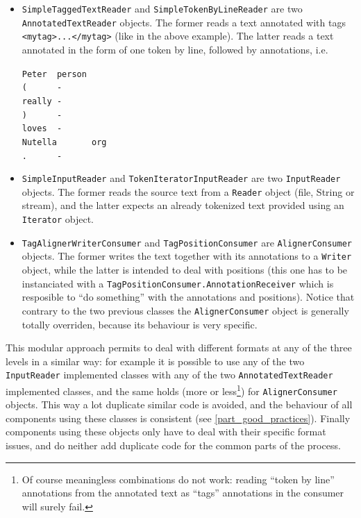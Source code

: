 \documentclass{article}
\newenvironment{xitemize}{
\begin{itemize}
  \setlength{\itemsep}{.3\baselineskip}
  \setlength{\topsep}{0pt}
  \setlength{\parskip}{0pt}
  \setlength{\parsep}{0pt}
}{\end{itemize}}
\begin{document}
\begin{xitemize}
\item {\tt SimpleTaggedTextReader} and {\tt SimpleTokenByLineReader} are two {\tt AnnotatedTextReader} objects. The former reads a text annotated with tags \verb+<mytag>...</mytag>+ (like in the above example). The latter reads a text annotated in the form of one token by line, followed by annotations, i.e. 

\verb+Peter  person+\\
\verb+(      -+\\
\verb+really -+\\
\verb+)      -+\\
\verb+loves  -+\\
\verb+Nutella       org+\\
\verb+.      -+

\item {\tt SimpleInputReader} and {\tt TokenIteratorInputReader} are two {\tt InputReader} objects. The former reads the source text from a {\tt Reader} object (file, String or stream), and the latter expects an already tokenized text provided using an {\tt Iterator} object.
\item {\tt TagAlignerWriterConsumer} and {\tt TagPositionConsumer} are {\tt AlignerConsumer} objects. The former writes the text together with its annotations to a {\tt Writer} object, while the latter is intended to deal with positions (this one has to be instanciated with a {\tt TagPositionConsumer.AnnotationReceiver} which is resposible to ``do something'' with the annotations and positions). Notice that contrary to the two previous classes the {\tt AlignerConsumer} object is generally totally overriden, because its behaviour is very specific.
\end {xitemize}


This modular approach permits to deal with different formats at any of the three levels in a similar way: for example it is possible to use any of the two {\tt InputReader} implemented classes with any of the two {\tt AnnotatedTextReader} implemented classes, and the same holds (more or less\footnote{Of course meaningless combinations do not work: reading ``token by line'' annotations from the annotated text as ``tags'' annotations in the consumer will surely fail.}) for {\tt AlignerConsumer} objects. This way a lot duplicate similar code is avoided, and the behaviour of all components using these classes is consistent (see \ref{part_good_practices}). Finally components using these objects only have to deal with their specific format issues, and do neither add duplicate code for the common parts of the process.
\end{document}

